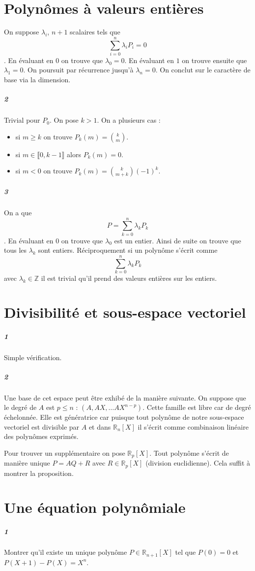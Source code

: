\documentclass[10pt,a4paper]{article}
\begin{document}
\section{Polynômes à valeurs entières}
On suppose $\lambda_i$, $n+1$ scalaires tels que $$ \sum_{i=0}^n \lambda_i P_i=0$$. En évaluant en $0$ on trouve que $\lambda_0=0$. En évaluant en $1$ on trouve ensuite que $\lambda_1=0$. On poursuit par récurrence jusqu'à $\lambda_n=0$. On conclut sur le caractère de base via la dimension.
\subparagraph{2}Trivial pour $P_0$. On pose $k>1$. On a plusieurs cas :
\begin{itemize}
\item si $m \ge k$ on trouve $P_k(m) = \binom{k}{m}$.
\item si $m \in \llbracket 0,k-1 \rrbracket$ alors $P_k(m)=0$.
\item si $m<0$ on trouve $P_k(m)= \binom{k}{m+k} (-1)^k$.
\end{itemize}
\subparagraph{3}On a que $$P = \sum_{k=0}^n \lambda_k P_k$$. En évaluant en $0$ on trouve que $\lambda_0$ est un entier. Ainsi de suite on trouve que tous les $\lambda_k$ sont entiers. Réciproquement si un polynôme s'écrit comme $$\sum_{k=0}^n \lambda_k P_k$$ avec $\lambda_k \in \mathbb{Z}$ il est trivial qu'il prend des valeurs entières sur les entiers.

\section{Divisibilité et sous-espace vectoriel}
\subparagraph{1}Simple vérification. 
\subparagraph{2}Une base de cet espace peut être exhibé de la manière suivante. On suppose que le degré de $A$ est $p\le n$ : $(A,AX,\dots AX^{n-p})$. Cette famille est libre car de degré échelonnée. Elle est génératrice car puisque tout polynôme de notre sous-espace vectoriel est divisible par $A$ et dans $\mathbb{R}_n[X]$ il s'écrit comme combinaison linéaire des polynômes exprimés. 

Pour trouver un supplémentaire on pose $\mathbb{R}_p[X]$. Tout polynôme s'écrit de manière unique $P=AQ+R$ avec $R \in \mathbb{R}_p[X]$ (division euclidienne). Cela suffit à montrer la proposition.

\section{Une équation polynômiale}
\subparagraph{1}Montrer qu'il existe un unique polynôme $P\in \mathbb{R}_{n+1}[X]$ tel que $P(0)=0$ et $P(X+1)-P(X)=X^n$.
\end{document}
